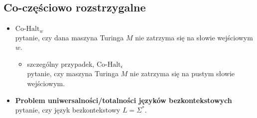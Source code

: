 \documentclass{article}
\theoremstyle{definition}
\theoremstyle{remark}
\begin{document}
\newpage

\subsection{Co-częściowo rozstrzygalne}
\begin{itemize}
    \item \textbf{$\text{Co-Halt}_w$} \\
    pytanie, czy dana maszyna Turinga $M$ nie zatrzyma się na słowie wejściowym $w$.
    
    \begin{itemize}
        \item szczególny przypadek, \textbf{$\text{Co-Halt}_{\epsilon}$} \\
        pytanie, czy maszyna Turinga $M$ nie zatrzyma się na pustym słowie wejściowym.
    \end{itemize}

    \item \textbf{Problem uniwersalności/totalności języków bezkontekstowych} \\
    pytanie, czy język bezkontekstowy $L = \Sigma^*$.
\end{itemize}
\end{document}
